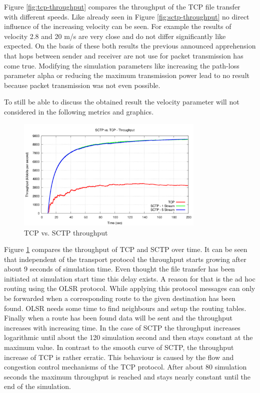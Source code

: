 \documentclass[a4paper]{article}
\begin{document}
Figure \ref{fig:tcp-throughput} compares the throughput of the TCP file transfer with different speeds. Like already seen in Figure \ref{fig:sctp-throughput} no direct influence of the increasing velocity can be seen. For example the results of velocity 2.8 and 20 m/s are very close and do not differ significantly like expected. On the basis of these both results the previous announced apprehension that hops between sender and receiver are not use for packet transmission has come true. Modifying the simulation parameters like increasing the path-loss parameter alpha or reducing the maximum transmission power lead to no result because packet transmission was not even possible.

To still be able to discuss the obtained result the velocity parameter will not considered in the following metrics and graphics.

\begin{figure}[H]
	\centering
	\includegraphics[width=0.8\textwidth]{imgs/sctp-vs-tcp-throughput.png}
	\caption{TCP vs. SCTP throughput}
	\label{fig:tcp-vs-sctp-throughput}
\end{figure}

Figure \ref{fig:tcp-vs-sctp-throughput} compares the throughput of TCP and SCTP over time. It can be seen that independent of the transport protocol the throughput starts growing after about 9 seconds of simulation time. Even thought the file transfer has been initiated at simulation start time this delay exists. A reason for that is the ad hoc routing using the OLSR protocol. While applying this protocol messages can only be forwarded when a corresponding route to the given destination has been found. OLSR needs some time to find neighbours and setup the routing tables. 
Finally when a route has been found data will be sent and the throughput increases with increasing time. In the case of SCTP the throughput increases logarithmic until about the 120 simulation second and then stays constant at the maximum value. In contrast to the smooth curve of SCTP, the throughput increase of TCP is rather erratic. This behaviour is caused by the flow and congestion control mechanisms of the TCP protocol. After about 80 simulation seconds the maximum throughput is reached and stays nearly constant until the end of the simulation.
\end{document}
